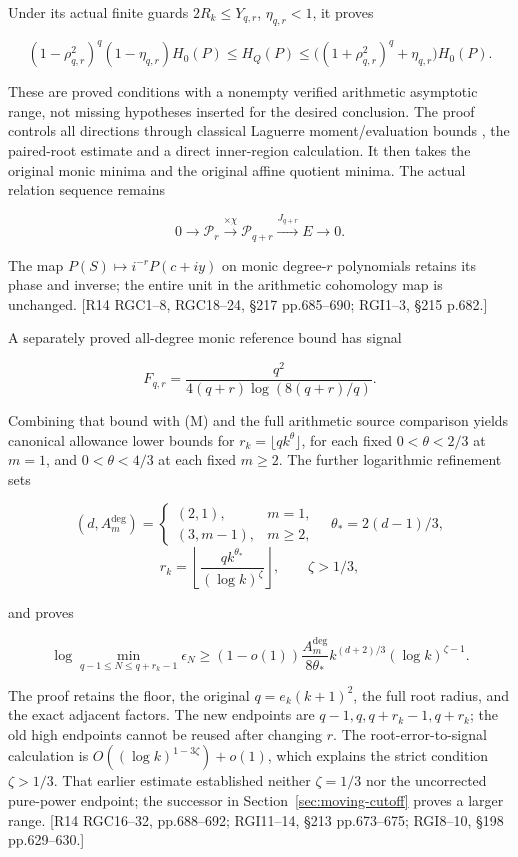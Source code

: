 Under its actual finite guards \(2R_k\le Y_{q,r}\), \(\eta_{q,r}<1\), it proves

\[
(1-\rho_{q,r}^2)^q(1-\eta_{q,r})H_0(P)
\le H_Q(P)
\le\bigl((1+\rho_{q,r}^2)^q+\eta_{q,r}\bigr)H_0(P).
\tag{M}
\]

These are proved conditions with a nonempty verified arithmetic asymptotic range, not missing hypotheses inserted for the desired conclusion. The proof controls all directions through classical Laguerre moment/evaluation bounds \cite{Szego1975,DLMF18Current}, the paired-root estimate and a direct inner-region calculation. It then takes the original monic minima and the original affine quotient minima. The actual relation sequence remains

\[
0\longrightarrow\mathcal P_r\xrightarrow{\times\chi}
\mathcal P_{q+r}\xrightarrow{J_{q+r}}E\longrightarrow0.
\]

The map \(P(S)\mapsto i^{-r}P(c+iy)\) on monic degree-\(r\) polynomials retains its phase and inverse; the entire unit in the arithmetic cohomology map is unchanged. {[}R14 RGC1--8, RGC18--24, §217 pp.685--690; RGI1--3, §215 p.682.{]}

A separately proved all-degree monic reference bound has signal

\[
F_{q,r}=\frac{q^2}{4(q+r)\log(8(q+r)/q)}.
\]

Combining that bound with (M) and the full arithmetic source comparison yields canonical allowance lower bounds for \(r_k=\lfloor qk^\theta\rfloor\), for each fixed \(0<\theta<2/3\) at \(m=1\), and \(0<\theta<4/3\) at each fixed \(m\ge2\). The further logarithmic refinement sets

\[
(d,A_m^{\deg})=
\begin{cases}(2,1),&m=1,\\(3,m-1),&m\ge2,\end{cases}
\quad\theta_*=2(d-1)/3,
\] \[
r_k=\left\lfloor\frac{qk^{\theta_*}}{(\log k)^\zeta}\right\rfloor,
\qquad\zeta>1/3,
\]

and proves

\[
\log\min_{q-1\le N\le q+r_k-1}\epsilon_N
\ge(1-o(1))\frac{A_m^{\deg}}{8\theta_*}
 k^{(d+2)/3}(\log k)^{\zeta-1}.
\tag{N}
\]

The proof retains the floor, the original \(q=e_k(k+1)^2\), the full root radius, and the exact adjacent factors. The new endpoints are \(q-1,q,q+r_k-1,q+r_k\); the old high endpoints cannot be reused after changing \(r\). The root-error-to-signal calculation is \(O((\log k)^{1-3\zeta})+o(1)\), which explains the strict condition \(\zeta>1/3\). That earlier estimate established neither \(\zeta=1/3\) nor the uncorrected pure-power endpoint; the successor in Section~\ref{sec:moving-cutoff} proves a larger range. {[}R14 RGC16--32, pp.688--692; RGI11--14, §213 pp.673--675; RGI8--10, §198 pp.629--630.{]}

